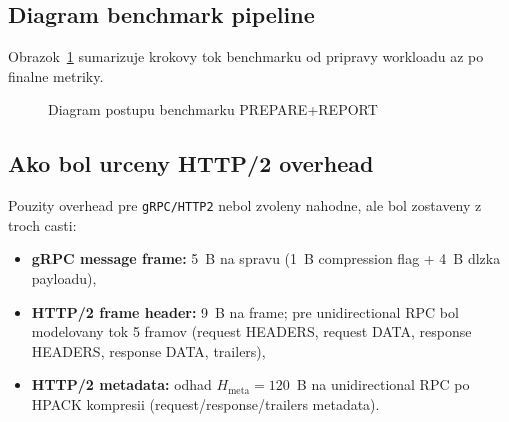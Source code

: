 \documentclass[12pt,a4paper]{report}
\begin{document}
\subsection{Diagram benchmark pipeline}

Obrazok~\ref{fig:benchmark-pipeline} sumarizuje krokovy tok benchmarku
od pripravy workloadu az po finalne metriky.

\begin{figure}[htbp]
\centering
{}
\caption{Diagram postupu benchmarku PREPARE+REPORT}
\label{fig:benchmark-pipeline}
\end{figure}

\subsection{Ako bol urceny HTTP/2 overhead}

Pouzity overhead pre \texttt{gRPC/HTTP2} nebol zvoleny nahodne, ale bol
zostaveny z troch casti:
\begin{itemize}
  \item \textbf{gRPC message frame:} 5~B na spravu (1~B compression flag +
  4~B dlzka payloadu),
  \item \textbf{HTTP/2 frame header:} 9~B na frame; pre unidirectional RPC bol
  modelovany tok 5 framov
  (request HEADERS, request DATA, response HEADERS, response DATA, trailers),
  \item \textbf{HTTP/2 metadata:} odhad $H_{\text{meta}}=120$~B na unidirectional RPC
  po HPACK kompresii (request/response/trailers metadata).
\end{itemize}
\end{document}
